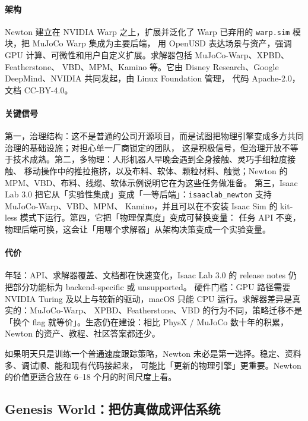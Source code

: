 \documentclass[UTF8, 11pt, a4paper, fontset=windows]{ctexart}
\newcommand{\term}[1]{\texttt{#1}}
\begin{document}
\paragraph{架构}
Newton 建立在 NVIDIA Warp 之上，扩展并泛化了 Warp 已弃用的 \term{warp.sim} 模块，把 MuJoCo Warp 集成为主要后端，
用 OpenUSD 表达场景与资产，强调 GPU 计算、可微性和用户自定义扩展。求解器包括 MuJoCo-Warp、XPBD、Featherstone、
VBD、MPM、Kamino 等。它由 Disney Research、Google DeepMind、NVIDIA 共同发起，由 Linux Foundation 管理，
代码 Apache-2.0，文档 CC-BY-4.0。

\paragraph{关键信号}
第一，治理结构：这不是普通的公司开源项目，而是试图把物理引擎变成多方共同治理的基础设施；对担心单一厂商锁定的团队，
这是积极信号，但治理开放不等于技术成熟。第二，多物理：人形机器人早晚会遇到全身接触、灵巧手细粒度接触、
移动操作中的推拉拖挤，以及布料、软体、颗粒材料、触觉；Newton 的 MPM、VBD、布料、线缆、软体示例说明它在为这些任务做准备。
第三，Isaac Lab 3.0 把它从「实验性集成」变成「一等后端」：\term{isaaclab\_newton} 支持 MuJoCo-Warp、VBD、MPM、
Kamino，并且可以在不安装 Isaac Sim 的 kit-less 模式下运行。第四，它把「物理保真度」变成可替换变量：
任务 API 不变，物理后端可换，这会让「用哪个求解器」从架构决策变成一个实验变量。

\paragraph{代价}
年轻：API、求解器覆盖、文档都在快速变化，Isaac Lab 3.0 的 release notes 仍把部分功能标为 backend-specific 或 unsupported。
硬件门槛：GPU 路径需要 NVIDIA Turing 及以上与较新的驱动，macOS 只能 CPU 运行。求解器差异是真实的：MuJoCo-Warp、
XPBD、Featherstone、VBD 的行为不同，策略迁移不是「换个 flag 就等价」。生态仍在建设：相比 PhysX / MuJoCo 数十年的积累，
Newton 的资产、教程、社区答案都还少。

\begin{caution}
如果明天只是训练一个普通速度跟踪策略，Newton 未必是第一选择。稳定、资料多、调试顺、能和现有代码接起来，
可能比「更新的物理引擎」更重要。Newton 的价值更适合放在 6--18 个月的时间尺度上看。
\end{caution}

\subsection{Genesis World：把仿真做成评估系统}
\end{document}
